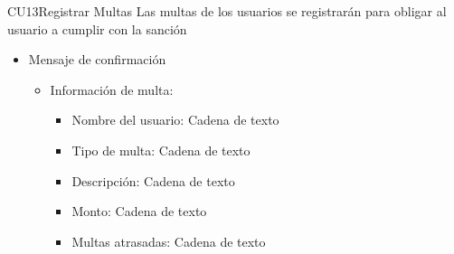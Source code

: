 \begin{UseCase}{CU13}{Registrar Multas}{
	Las multas de los usuarios se registrarán para obligar al usuario a cumplir con la sanción
	}
{\begin{itemize}
\begin{itemize}
\begin{itemize}
			        		\item Multas atrasadas: Cadena de texto
	    		    		\item Fecha de límite de cumplimiento: Fecha en formato dd/mm/yyyy
	        			\end{itemize}
	     		   \end{itemize}
	        	   \item Mensaje de confirmación
	        	   \begin{itemize}
	        			\item Información de multa:
	        			\begin{itemize}
	        				\item Nombre del usuario: Cadena de texto
	        				\item Tipo de multa: Cadena de texto
		        			\item Descripción: Cadena de texto
		        			\item Monto: Cadena de texto
	    	    			\item Multas atrasadas: Cadena de texto
	        			\end{itemize}
	        		\end{itemize}
	    		\end{itemize}		
		}
	\end{UseCase}
